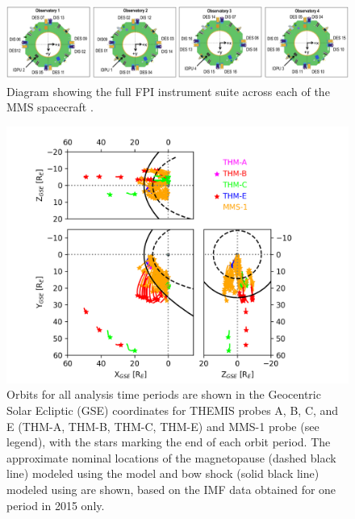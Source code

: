 \begin{figure}
    \centering
    \includegraphics[width=\textwidth]{Figures//Instrumentation/Pollock_Figure5.jpg}
    \caption[MMS FPI instrument suite]{Diagram showing the full FPI instrument suite across each of the MMS spacecraft \citep{Pollock:2016}.}
    \label{fig:fpi-mms}
\end{figure}

\begin{figure}
    \centering
    \includegraphics[width=\textwidth]{Figures/Orbits/all_TE_orbits_xy_xz_yz.png}
    \caption[Orbits for all observation periods]{Orbits for all analysis time periods are shown in the Geocentric Solar Ecliptic (GSE) coordinates for THEMIS probes A, B, C, and E (THM-A, THM-B, THM-C, THM-E) and MMS-1 probe (see legend), with the stars marking the end of each orbit period. The approximate nominal locations of the magnetopause (dashed black line) modeled using the \cite{Shue:1997} model and bow shock (solid black line) modeled using \cite{SlavinHolzer:1984} are shown, based on the IMF data obtained for one period in 2015 only.}
    \label{fig:all-orbits-plot}
\end{figure}

